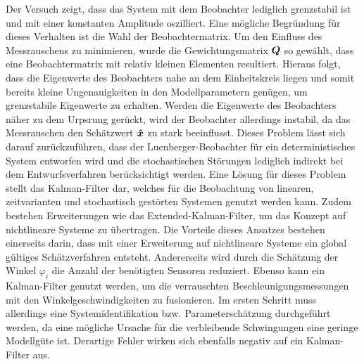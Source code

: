 Der Versuch zeigt, dass das System mit dem Beobachter lediglich grenzstabil ist und mit einer konstanten Amplitude oszilliert. Eine mögliche Begründung für dieses Verhalten ist die Wahl der Beobachtermatrix. Um den Einfluss des Messrauschens zu minimieren, wurde die Gewichtungsmatrix $\boldsymbol{Q}$ so gewählt, dass eine Beobachtermatrix mit relativ kleinen Elementen resultiert. Hieraus folgt, dass die Eigenwerte des Beobachters nahe an dem Einheitskreis liegen und somit bereits kleine Ungenauigkeiten in den Modellparametern genügen, um grenzstabile Eigenwerte zu erhalten. Werden die Eigenwerte des Beobachters näher zu dem Urpsrung gerückt, wird der Beobachter allerdings instabil, da das Messrauschen den Schätzwert $\boldsymbol{\hat{x}}$ zu stark beeinflusst. Dieses Problem lässt sich darauf zurückzuführen, dass der Luenberger-Beobachter für ein deterministisches System entworfen wird und die stochastischen Störungen lediglich indirekt bei dem Entwurfsverfahren berücksichtigt werden. Eine Lösung für dieses Problem stellt das Kalman-Filter dar, welches für die Beobachtung von linearen, zeitvarianten und stochastisch gestörten Systemen genutzt werden kann. Zudem bestehen Erweiterungen wie das Extended-Kalman-Filter, um das Konzept auf nichtlineare Systeme zu übertragen. 
Die Vorteile dieses Ansatzes bestehen einerseits darin, dass mit einer Erweiterung auf nichtlineare Systeme ein global gültiges Schätzverfahren entsteht. Andererseits wird durch die Schätzung der Winkel $\varphi_i$ die Anzahl der benötigten Sensoren reduziert. Ebenso kann ein Kalman-Filter genutzt werden, um die verrauschten Beschleunigungsmessungen mit den Winkelgeschwindigkeiten zu fusionieren. Im ersten Schritt muss allerdings eine Systemidentifikation bzw. Parameterschätzung durchgeführt werden, da eine mögliche Ursache für die verbleibende Schwingungen eine geringe Modellgüte ist. Derartige Fehler wirken sich ebenfalls negativ auf ein Kalman-Filter aus.